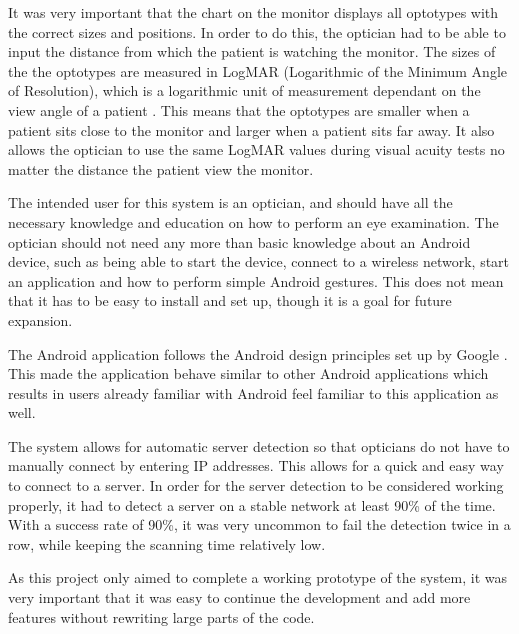 \documentclass[12pt,a4paper,notitlepage]{report}
\begin{document}

It was very important that the chart on the monitor displays all optotypes with the correct sizes and positions. In order to do this, the optician had to be able to input the distance from which the patient is watching the monitor. The sizes of the the optotypes are measured in LogMAR (Logarithmic of the Minimum Angle of Resolution), which is a logarithmic unit of measurement dependant on the view angle of a patient \cite{Bailey}. This means that the optotypes are smaller when a patient sits close to the monitor and larger when a patient sits far away. It also allows the optician to use the same LogMAR values during visual acuity tests no matter the distance the patient view the monitor.

The intended user for this system is an optician, and should have all the necessary knowledge and education on how to perform an eye examination. The optician should not need any more than basic knowledge about an Android device, such as being able to start the device, connect to a wireless network, start an application and how to perform simple Android gestures. This does not mean that it has to be easy to install and set up, though it is a goal for future expansion. 

The Android application follows the Android design principles set up by Google \cite{android_design}. This made the application behave similar to other Android applications which results in users already familiar with Android feel familiar to this application as well.

The system allows for automatic server detection so that opticians do not have to manually connect by entering IP addresses. This allows for a quick and easy way to connect to a server. In order for the server detection to be considered working properly, it had to detect a server on a stable network at least 90\% of the time. With a success rate of 90\%, it was very uncommon to fail the detection twice in a row, while keeping the scanning time relatively low.

As this project only aimed to complete a working prototype of the system, it was very important that it was easy to continue the development and add more features without rewriting large parts of the code.
\end{document}
